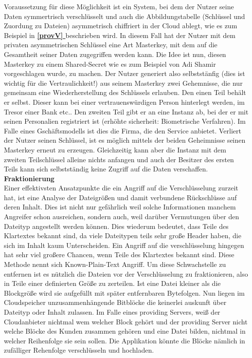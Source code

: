 \documentclass[12pt,a4paper,bibliography=totocnumbered,listof=totocnumbered]{scrartcl}
\newcommand*{\fullref}[1]{\textbf{\hyperref[{#1}]{\ref*{#1} \nameref*{#1}}}}
\begin{document}
Voraussetzung für diese Möglichkeit ist ein System, bei dem der Nutzer seine Daten symmertrisch verschlüsselt und auch die Abbildungstabelle (Schlüssel und Zuordung zu Dateien) asymmetrisch chiffriert in der Cloud ablegt, wie es zum Beispiel in \fullref{provV} beschrieben wird. In diesem Fall hat der Nutzer mit dem privaten asymmetrischen Schlüssel eine Art Masterkey, mit dem auf die Gesamtheit seiner Daten zugegriffen werden kann. Die Idee ist nun, diesen Masterkey zu einem Shared-Secret wie es zum Beispiel von Adi Shamir vorgeschlagen wurde, zu machen. Der Nutzer generiert also selbststänfig (dies ist wichtig für die Vertraulichkeit!) aus seinem Masterkey zwei Gehemnisse, die nur gemeinsam eine Wiederherstellung des Schlüssels erlauben. Den einen Teil behält er selbst. Dieser kann bei einer vertrauenswürdigen Person hinterlegt werden, im Tresor einer Bank etc.. Den zweiten Teil gibt er an eine Instanz ab, bei der er mit seinen Personalien registriert ist (erhöhte sicherheit: Biometrische Verfahren). Im Falle eines Gschäftsmodells ist dies die Firma, die den Service anbietet. Verliert der Nutzer seinen Schlüssel, ist es möglich mittels der beiden Geheimnisse seinen Masterkey erneut zu erzeugen. Gleichzeitig kann aber die Instanz mit dem zweiten Teilschlüssel alleine nichts anfangen und auch der Besitzer des ersten Teils kann sich selbstständig keine Zugriff auf die Daten verschaffen.\cite{11}
\\\textbf{Fraktionierung}\\
Einer effektivsten Ansatzpunkte die ein Angriff auf die Verschlüsselung zurzeit hat, ist eine Analyse der Dateigrößen und damit verbundene Rückschlüsse auf deren Inhalt. Dies ist nicht nur gefährlich weil solche Informationen manchem Angreifer schon ausreichen, sondern auch, weil darüber Vermutungen über den Dateityp angestellt werden können. Dies wiederum bedeutet, dass Teile des Klartextes bekannt sind, da viele Dateitypen teils sehr große Header haben, die sich im Inhalt kaum Unterscheiden. Ein Angriff auf die verschlüsselung hingegen hat sehr viel großere Chancen, wenn Teile des Klartextes bekannt sind. Diese Methode nennt sich Known-Plain-Text Angriff. Um diese Schwachstelle zu entfernen ist es nützlich die Dateien vor der Verschlüsselung zu fraktionieren, also in Teile einer definierten Größe zu zerteilen. Ist eine Datei kleiner als die Blockgröße wird sie aufgefüllt mit später entfernbaren Bytefolgen. Nun liegen im Cloudspeicher unzusammenhängende Bitblöcke die keinerlei auskunft über Dateityp oder Inhalt zulassen. Im Falle eines providing Servers, weiß der Cloudanbieter nichtmal wem welcher Block gehört und der providing Server nicht welche Blöcke des Kunden zusammen gehören und eine Datei bilden, nichtmal in welcher Reihenfolge sie sein sollen. Die Applikation könnte die Blöcke nämlich in zufälliger Rehenfolge verschlüsseln und hochladen.
\end{document}
